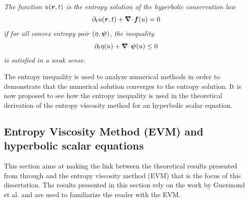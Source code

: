%
\begin{definition}
\emph{The function $u(\boldsymbol r, t)$ is the entropy solution of the hyperbolic conservation law 
%
\begin{equation}
\partial_t u( \boldsymbol r, t) + \boldsymbol{\nabla}\! \cdot \! \boldsymbol f(u) = 0 \nonumber
\end{equation}
%
if for all convex entropy pair $\left( \eta,\boldsymbol\psi \right)$, the inequality 
%
\begin{equation}
\partial_t \eta (u) + \boldsymbol{\nabla}\! \cdot \! \boldsymbol\psi (u) \leq 0 \nonumber
\end{equation}
%
is satisfied in a weak sense.}
\end{definition}
%
The entropy inequality is used to analyze numerical methods in order to demonstrate that the numerical solution converges to the entropy solution. It is now proposed to see how the entropy inequality is used in the theoretical derivation of the entropy viscosity method for an hyperbolic scalar equation. 
%
\subsection{Entropy Viscosity Method (EVM) and hyperbolic scalar equations}\label{sec:evm_hyp_sc_sct1b}
%
This section aims at making the link between the theoretical results presented from  through  and the entropy viscosity method (EVM) that is the focus of this dissertation. The results presented in this section rely on the work by Guermond et al. \cite{jlg1, jlg2, jlg3, valentin} and are used to familiarize the reader with the EVM.

